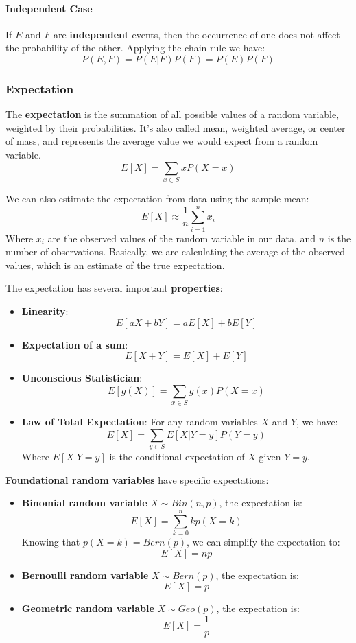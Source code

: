 \paragraph{Independent Case}
If $E$ and $F$ are \textbf{independent} events, then the occurrence of one does not affect the probability of the other. 
Applying the chain rule we have:
\begin{equation}
    P(E,F) = P(E|F)P(F) = P(E)P(F) 
\end{equation}

\subsubsection{Expectation}
The \textbf{expectation} is the summation of all possible values of a random variable, weighted by their probabilities.
It's also called mean, weighted average, or center of mass, and represents the average value we would expect from a random variable.
\begin{equation}
    E[X] = \sum_{x \in S} x P(X=x)
\end{equation}

We can also estimate the expectation from data using the sample mean:
\begin{equation}
    E[X] \approx \frac{1}{n} \sum_{i=1}^{n} x_i
\end{equation}
Where $x_i$ are the observed values of the random variable in our data, and $n$ is the number of observations.
Basically, we are calculating the average of the observed values, which is an estimate of the true expectation.

The expectation has several important \textbf{properties}:
\begin{itemize}
    \item \textbf{Linearity}: 
    \[
        E[aX + bY] = aE[X] + bE[Y]
    \]
    \item \textbf{Expectation of a sum}: 
        \[
            E[X + Y] = E[X] + E[Y]
        \]
    \item \textbf{Unconscious Statistician}: 
        \[
            E[g(X)] = \sum_{x \in S} g(x) P(X=x)
        \]
    \item \textbf{ Law of Total Expectation}: For any random variables $X$ and $Y$, we have:
        \[
            E[X] = \sum_{y \in S} E[X|Y=y] P(Y=y)
        \]
        Where $E[X|Y=y]$ is the conditional expectation of $X$ given $Y=y$.
\end{itemize}

\textbf{Foundational random variables} have specific expectations:
\begin{itemize}
    \item \textbf{Binomial random variable} $X \sim Bin(n, p)$, the expectation is:
    \[
        E[X] = \sum_{k=0}^{n} k p(X=k)
    \]
    Knowing that $p(X=k) = Bern(p)$, we can simplify the expectation to:
    \[
        E[X] = np
    \]
    \item \textbf{Bernoulli random variable} $X \sim Bern(p)$, the expectation is:
    \[
        E[X] = p
    \]
    \item \textbf{Geometric random variable} $X \sim Geo(p)$, the expectation is:
    \[    
        E[X] = \frac{1}{p}
    \]
\end{itemize}


